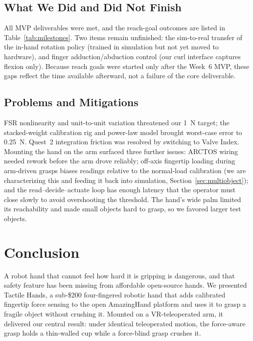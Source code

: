 \documentclass[acmlarge,screen,nonacm]{acmart}
\begin{document}
\subsection{What We Did and Did Not Finish}
All MVP deliverables were met, and the reach-goal outcomes are listed in
Table~\ref{tab:milestones}. Two items remain unfinished: the sim-to-real
transfer of the in-hand rotation policy (trained in simulation but not yet moved to hardware),
and finger adduction/abduction control (our curl interface captures flexion
only). Because reach goals were started only after the
Week~6 MVP, these gaps reflect the time available afterward, not a failure of the
core deliverable.

\subsection{Problems and Mitigations}
FSR nonlinearity and unit-to-unit variation threatened our 1~N target; the
stacked-weight calibration rig and power-law model brought worst-case error to
0.25~N. Quest~2 integration friction was resolved by switching to Valve Index. Mounting the hand
on the arm surfaced three further issues: ARCTOS wiring needed rework before the
arm drove reliably; off-axis fingertip loading during arm-driven grasps biases
readings relative to the normal-load calibration (we are characterizing this and
feeding it back into simulation, Section~\ref{sec:multiobject}); and the
read--decide--actuate loop has enough latency that the operator must close slowly
to avoid overshooting the threshold. The hand's wide palm limited its
reachability and made small objects hard to grasp, so we favored larger test
objects.

\section{Conclusion}
\label{sec:conclusion}
A robot hand that cannot feel how hard it is gripping is dangerous, and that
safety feature has been missing from affordable open-source hands. We presented
Tactile Hands, a sub-\$200 four-fingered robotic hand that adds calibrated
fingertip force sensing to the open AmazingHand platform and uses it to grasp a
fragile object without crushing it. Mounted on a VR-teleoperated arm, it
delivered our central result: under identical teleoperated motion, the
force-aware grasp holds a thin-walled cup while a force-blind grasp crushes it.
\end{document}
